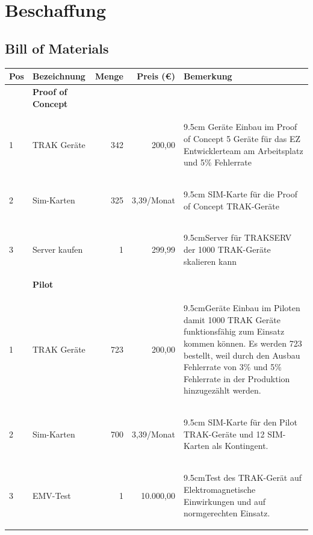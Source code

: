 \documentclass[a4paper,10pt]{scrartcl}
\newcommand\Kommentar[2][9.5cm]{\begin{varwidth}{#1}\flushleft#2\end{varwidth}}
\begin{document}
\clearpage


\section{Beschaffung}
\subsection{Bill of Materials}
\begin{adjustbox}{width=\textwidth}
\begin{tabular}{llrrl} 
\toprule
\textbf{Pos} & \textbf{Bezeichnung} & \textbf{Menge} & \textbf{Preis (\euro{})} &\textbf{Bemerkung}\\ 
\midrule 
\midrule
& \textbf{Proof of Concept} &  &\\
\midrule
1  & TRAK Geräte & 342 & 200,00 &{\Kommentar{320 Geräte Einbau im Proof of Concept 5 Geräte für das EZ Entwicklerteam am Arbeitsplatz und 5\% Fehlerrate\linebreak}}\\
\midrule
2  & Sim-Karten & 325 & 3,39/Monat &{\Kommentar{325 SIM-Karte für die Proof of Concept TRAK-Geräte\linebreak}}\\
\midrule
3  & Server kaufen & 1 & 299,99 &{\Kommentar{Server für TRAKSERV der 1000 TRAK-Geräte skalieren kann\linebreak}}\\
\midrule
& \textbf{Pilot} &  &\\
\midrule
1  & TRAK Geräte & 723 & 200,00 &{\Kommentar{Geräte Einbau im Piloten damit 1000 TRAK Geräte funktionsfähig zum Einsatz kommen können. Es werden 723 bestellt, weil durch den Ausbau Fehlerrate von 3\% und 5\% Fehlerrate in der Produktion hinzugezählt werden.\linebreak}}\\
\midrule
2  & Sim-Karten & 700 & 3,39/Monat &{\Kommentar{688 SIM-Karte für den Pilot TRAK-Geräte und 12 SIM-Karten als Kontingent.\linebreak}}\\
\midrule
3  & EMV-Test & 1 & 10.000,00 &{\Kommentar{Test des TRAK-Gerät auf Elektromagnetische Einwirkungen und
auf normgerechten Einsatz. \linebreak}}\\
\bottomrule
\end{tabular}
\end{adjustbox}
\end{document}
